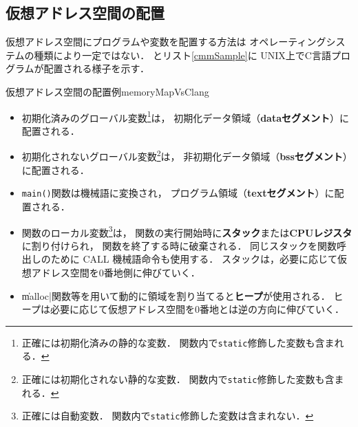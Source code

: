 \subsection{仮想アドレス空間の配置}
仮想アドレス空間にプログラムや変数を配置する方法は
オペレーティングシステムの種類により一定ではない．
とリスト\ref{cmmSample}に
UNIX上でC言語プログラムが配置される様子を示す．

{仮想アドレス空間の配置例}{memoryMapVsClang}

\begin{itemize}
\item 初期化済みのグローバル変数\footnote{
正確には初期化済みの静的な変数．
関数内で{\tt static}修飾した変数も含まれる．}は，
初期化データ領域（{\bf dataセグメント}）に配置される．
\item 初期化されないグローバル変数\footnote{
正確には初期化されない静的な変数．
関数内で{\tt static}修飾した変数も含まれる．}は，
非初期化データ領域（{\bf bssセグメント}）に配置される．
\item {\tt main()}関数は機械語に変換され，
プログラム領域（{\bf textセグメント}）に配置される．
\item 関数のローカル変数\footnote{
正確には自動変数．
関数内で{\tt static}修飾した変数は含まれない．}は，
関数の実行開始時に{\bf スタック}または{\bf CPUレジスタ}に割り付けられ，
関数を終了する時に破棄される．
同じスタックを関数呼出しのために CALL 機械語命令も使用する．
スタックは，必要に応じて仮想アドレス空間を0番地側に伸びていく．
\item \|malloc|関数等を用いて動的に領域を割り当てると{\bf ヒープ}が使用される．
ヒープは必要に応じて仮想アドレス空間を0番地とは逆の方向に伸びていく．
\end{itemize}


